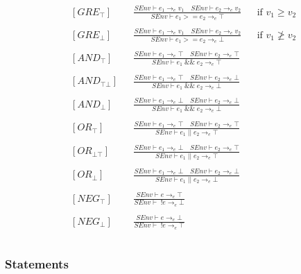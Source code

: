 \begin{align*}
&[GRE_\top] & &\frac{SEnv \vdash e_1 \rightarrow_e v_1 \quad SEnv \vdash e_2 \rightarrow_e v_2}{SEnv \vdash e_1 >= e_2 \rightarrow_e \top} & &\text{if } v_1 \geq v_2\\\\
&[GRE_\bot] & &\frac{SEnv \vdash e_1 \rightarrow_e v_1 \quad SEnv \vdash e_2 \rightarrow_e v_2}{SEnv \vdash e_1 >= e_2 \rightarrow_e \bot} & &\text{if } v_1 \ngeq v_2\\\\
&[AND_\top] & &\frac{SEnv \vdash e_1 \rightarrow_e \top \quad SEnv \vdash e_2 \rightarrow_e \top}{SEnv \vdash e_1\; \&\&\; e_2 \rightarrow_e \top}\\\\
&[AND_{\top\bot}] & &\frac{SEnv \vdash e_1 \rightarrow_e \top \quad SEnv \vdash e_2 \rightarrow_e \bot}{SEnv \vdash e_1\; \&\&\; e_2 \rightarrow_e \bot}\\\\
&[AND_\bot] & &\frac{SEnv \vdash e_1 \rightarrow_e \bot \quad SEnv \vdash e_2 \rightarrow_e \bot}{SEnv \vdash e_1\; \&\&\; e_2 \rightarrow_e \bot}\\\\
&[OR_{\top}] & &\frac{SEnv \vdash e_1 \rightarrow_e \top \quad SEnv \vdash e_2 \rightarrow_e \top}{SEnv \vdash e_1\; ||\; e_2 \rightarrow_e \top}\\\\
&[OR_{\bot\top}] & &\frac{SEnv \vdash e_1 \rightarrow_e \bot \quad SEnv \vdash e_2 \rightarrow_e \top}{SEnv \vdash e_1\; ||\; e_2 \rightarrow_e \top}\\\\
&[OR_{\bot}] & &\frac{SEnv \vdash e_1 \rightarrow_e \bot \quad SEnv \vdash e_2 \rightarrow_e \bot}{SEnv \vdash e_1\; ||\; e_2 \rightarrow_e \bot}\\\\
&[NEG_\top] & &\frac{SEnv \vdash e \rightarrow_e \top}{SEnv \vdash\; !e \rightarrow_e \bot}\\\\
&[NEG_\bot] & &\frac{SEnv \vdash e \rightarrow_e \bot}{SEnv \vdash\; !e \rightarrow_e \top}\\\\
\end{align*}

\subsubsection{Statements}

